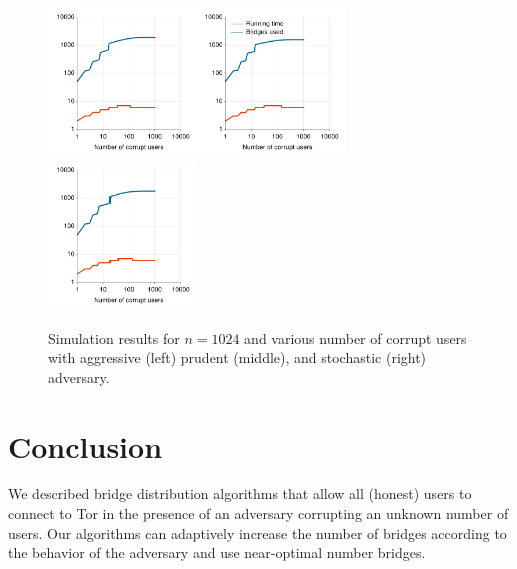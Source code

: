 \begin{figure}[tbph]
	\hspace{-0.8em}\includegraphics[width=0.35\textwidth]{images/plot-aggressive-VarT-1024}\hspace{-0.5em}\includegraphics[width=0.35\textwidth]{images/plot-prudent-VarT-1024}\hspace{-0.5em}\includegraphics[width=0.35\textwidth]{images/plot-stochastic-VarT-1024}\caption{Simulation results for $n=1024$ and various number of corrupt users
		with aggressive (left) prudent (middle), and stochastic (right) adversary.}
	\label{fig:circuit-1-1} 
\end{figure}

\section{Conclusion} \label{sec:conclusion}
We described bridge distribution algorithms that allow all (honest) users to connect to Tor in the presence of an adversary corrupting an unknown number of users. Our algorithms can adaptively increase the number of bridges according to the behavior of the adversary and use near-optimal number bridges.